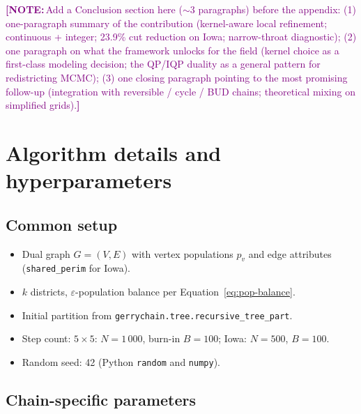 \documentclass[11pt]{article}
\newcommand{\note}[1]{\textcolor{purple}{\textbf{[NOTE:}\,#1\textbf{]}}}
\begin{document}
\note{Add a Conclusion section here ($\sim$3 paragraphs) before the
appendix:
(1) one-paragraph summary of the contribution (kernel-aware
local refinement; continuous + integer; 23.9\% cut reduction on Iowa;
narrow-throat diagnostic);
(2) one paragraph on what the framework unlocks for the field (kernel
choice as a first-class modeling decision; the QP/IQP duality as a
general pattern for redistricting MCMC);
(3) one closing paragraph pointing to the most promising follow-up
(integration with reversible / cycle / BUD chains; theoretical mixing
on simplified grids).}

\appendix
\section{Algorithm details and hyperparameters}\label{app:hyperparams}

\subsection{Common setup}\label{app:common}

\begin{itemize}
  \item Dual graph $G = (V, E)$ with vertex populations $p_v$ and
    edge attributes (\texttt{shared\_perim} for Iowa).
  \item $k$ districts, $\varepsilon$-population balance per
    Equation~\eqref{eq:pop-balance}.
  \item Initial partition from \texttt{gerrychain.tree.recursive\_tree\_part}.
  \item Step count: $5 \times 5$: $N = 1\,000$, burn-in $B = 100$;
    Iowa: $N = 500$, $B = 100$.
  \item Random seed: 42 (Python \texttt{random} and \texttt{numpy}).
\end{itemize}

\subsection{Chain-specific parameters}\label{app:chains}
\end{document}
